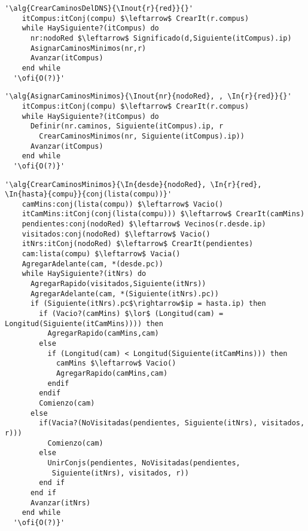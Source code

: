 \newpage

\begin{lstlisting}[mathescape]
  '\alg{CrearCaminosDelDNS}{\Inout{r}{red}}{}'
    itCompus:itConj(compu) $\leftarrow$ CrearIt(r.compus)
    while HaySiguiente?(itCompus) do                                                    
      nr:nodoRed $\leftarrow$ Significado(d,Siguiente(itCompus).ip)
      AsignarCaminosMinimos(nr,r)
      Avanzar(itCompus)
    end while
  '\ofi{O(?)}'
\end{lstlisting}

\begin{lstlisting}[mathescape]
  '\alg{AsignarCaminosMinimos}{\Inout{nr}{nodoRed}, , \In{r}{red}}{}'
    itCompus:itConj(compu) $\leftarrow$ CrearIt(r.compus)
    while HaySiguiente?(itCompus) do                                                    
      Definir(nr.caminos, Siguiente(itCompus).ip, r
        CrearCaminosMinimos(nr, Siguiente(itCompus).ip))
      Avanzar(itCompus)
    end while
  '\ofi{O(?)}'
\end{lstlisting}

\begin{lstlisting}[mathescape]
  '\alg{CrearCaminosMinimos}{\In{desde}{nodoRed}, \In{r}{red}, \In{hasta}{compu}}{conj(lista(compu))}'
    camMins:conj(lista(compu)) $\leftarrow$ Vacio()
    itCamMins:itConj(conj(lista(compu))) $\leftarrow$ CrearIt(camMins)
    pendientes:conj(nodoRed) $\leftarrow$ Vecinos(r.desde.ip)
    visitados:conj(nodoRed) $\leftarrow$ Vacio()
    itNrs:itConj(nodoRed) $\leftarrow$ CrearIt(pendientes)
    cam:lista(compu) $\leftarrow$ Vacia()
    AgregarAdelante(cam, *(desde.pc))
    while HaySiguiente?(itNrs) do 
      AgregarRapido(visitados,Siguiente(itNrs))
      AgregarAdelante(cam, *(Siguiente(itNrs).pc))
      if (Siguiente(itNrs).pc$\rightarrow$ip = hasta.ip) then
        if (Vacio?(camMins) $\lor$ (Longitud(cam) = Longitud(Siguiente(itCamMins)))) then
          AgregarRapido(camMins,cam)
        else
          if (Longitud(cam) < Longitud(Siguiente(itCamMins))) then
            camMins $\leftarrow$ Vacio()
            AgregarRapido(camMins,cam)
          endif
        endif
        Comienzo(cam)
      else
        if(Vacia?(NoVisitadas(pendientes, Siguiente(itNrs), visitados, r)))
          Comienzo(cam)
        else
          UnirConjs(pendientes, NoVisitadas(pendientes,
           Siguiente(itNrs), visitados, r))
        end if
      end if
      Avanzar(itNrs)
    end while 
  '\ofi{O(?)}'
\end{lstlisting}

\newpage

